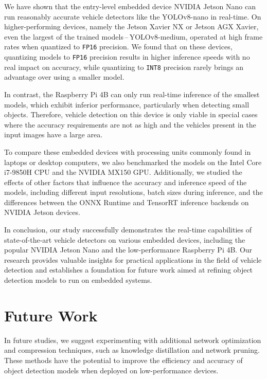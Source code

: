 We have shown that the entry-level embedded device NVIDIA Jetson Nano can run
reasonably accurate vehicle detectors like the YOLOv8-nano in real-time. On
higher-performing devices, namely the Jetson Xavier NX or Jetson AGX Xavier,
even the largest of the trained models\,--\,YOLOv8-medium, operated at high
frame rates when quantized to \texttt{FP16} precision. We found that on these
devices, quantizing models to \texttt{FP16} precision results in higher
inference speeds with no real impact on accuracy, while quantizing to
\texttt{INT8} precision rarely brings an advantage over using a smaller model.

In contrast, the Raspberry Pi 4B can only run real-time inference of the
smallest models, which exhibit inferior performance, particularly when detecting
small objects. Therefore, vehicle detection on this device is only viable in
special cases where the accuracy requirements are not as high and the vehicles
present in the input images have a large area.

To compare these embedded devices with processing units commonly found in
laptops or desktop computers, we also benchmarked the models on the Intel Core
i7-9850H CPU and the NVIDIA MX150 GPU. Additionally, we studied the effects of
other factors that influence the accuracy and inference speed of the models,
including different input resolutions, batch sizes during inference, and the
differences between the ONNX Runtime and TensorRT inference backends on NVIDIA
Jetson devices.

In conclusion, our study successfully demonstrates the real-time capabilities of
state-of-the-art vehicle detectors on various embedded devices, including the
popular NVIDIA Jetson Nano and the low-performance Raspberry Pi 4B. Our research
provides valuable insights for practical applications in the field of vehicle
detection and establishes a foundation for future work aimed at refining object
detection models to run on embedded systems.




\chapter{Future Work}
\label{FutureWork}

In future studies, we suggest experimenting with additional network optimization
and compression techniques, such as knowledge distillation and network pruning.
These methods have the potential to improve the efficiency and accuracy of
object detection models when deployed on low-performance devices.

